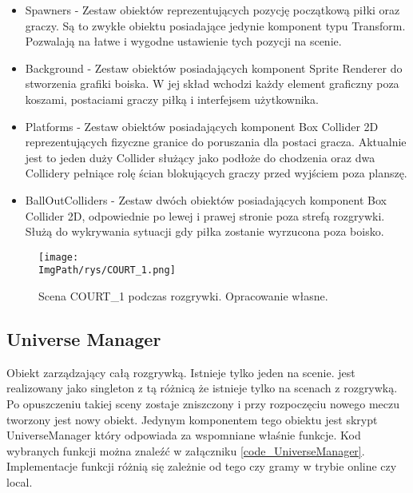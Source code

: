 \documentclass[a4paper,12pt,twoside,openany]{report}
\newcommand{\ImgPath}{.}
\begin{document}
\begin{itemize}
    \item Spawners - Zestaw obiektów reprezentujących pozycję początkową piłki oraz graczy. Są to zwykłe obiektu posiadające jedynie komponent typu Transform. Pozwalają na łatwe i wygodne ustawienie tych pozycji na scenie.
    \item Background - Zestaw obiektów posiadających komponent Sprite Renderer do stworzenia grafiki boiska. W jej skład wchodzi każdy element graficzny poza koszami, postaciami graczy piłką i interfejsem użytkownika.
    \item Platforms - Zestaw obiektów posiadających komponent Box Collider 2D reprezentujących fizyczne granice do poruszania dla postaci gracza. Aktualnie jest to jeden duży Collider służący jako podłoże do chodzenia oraz dwa Collidery pełniące rolę ścian blokujących graczy przed wyjściem poza planszę.
    \item BallOutColliders - Zestaw dwóch obiektów posiadających komponent Box Collider 2D, odpowiednie po lewej i prawej stronie poza strefą rozgrywki. Służą do wykrywania sytuacji gdy piłka zostanie wyrzucona poza boisko.
\end{itemize}

\begin{figure}[H]
	\begin{center}
\centering
\texttt{[image: \\ImgPath/rys/COURT\_1.png]}
\end{center}
	\caption{Scena COURT\_1 podczas rozgrywki. Opracowanie własne.}
	\label{COURT_1}
\end{figure}

\subsection{Universe Manager}
\label{universe_manager}
Obiekt zarządzający całą rozgrywką. Istnieje tylko jeden na scenie. jest realizowany jako singleton z tą różnicą że istnieje tylko na scenach z rozgrywką. Po opuszczeniu takiej sceny zostaje zniszczony i przy rozpoczęciu nowego meczu tworzony jest nowy obiekt. Jedynym komponentem tego obiektu jest skrypt UniverseManager który odpowiada za wspomniane właśnie funkcje. Kod wybranych funkcji można znaleźć w załączniku \ref{code_UniverseManager}. Implementacje funkcji różnią się zależnie od tego czy gramy w trybie online czy local.
\end{document}
